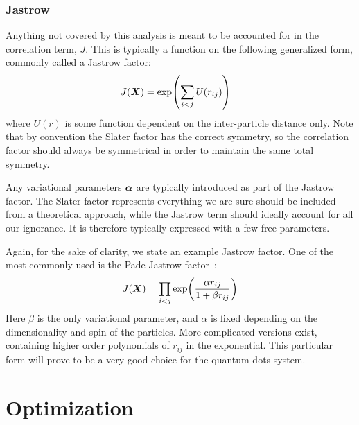 \documentclass[Thesis.tex]{subfiles}
\begin{document}
\subsubsection*{Jastrow}

Anything not covered by this analysis is meant to be accounted for in the correlation
term, $J$. This is typically a function on the following generalized form, commonly called a Jastrow
factor:
\begin{align}
    J(\bm{X}) &= \exp(\sum_{i < j} U(r_{ij}))
\end{align}
where $U(r)$ is some function dependent on the inter-particle distance only. Note that by
convention the Slater factor has the correct symmetry, so the correlation factor should
always be symmetrical in order to maintain the same total symmetry.

Any variational parameters $\bm{\alpha}$ are typically introduced as part of the Jastrow
factor. The Slater factor represents everything we are sure should be included
from a theoretical approach, while the Jastrow term should ideally account for all our ignorance.
It is therefore typically expressed with a few free parameters.

Again, for the sake of clarity, we state an example Jastrow factor. One of the most
commonly used is the Pade-Jastrow factor~\cite{Drummond-Towler-Needs-2008}:
\begin{align}
    J(\bm{X}) = \prod_{i < j} \exp(\frac{\alpha r_{ij}}{1 + \beta r_{ij} } )
\end{align}
Here $\beta$ is the only variational parameter, and $\alpha$ is fixed depending on the
dimensionality and spin of the particles. More complicated versions exist, containing
higher order polynomials of $r_{ij}$ in the exponential. This particular form
will prove to be a very good choice for the quantum dots system.




\section{Optimization}
\end{document}
